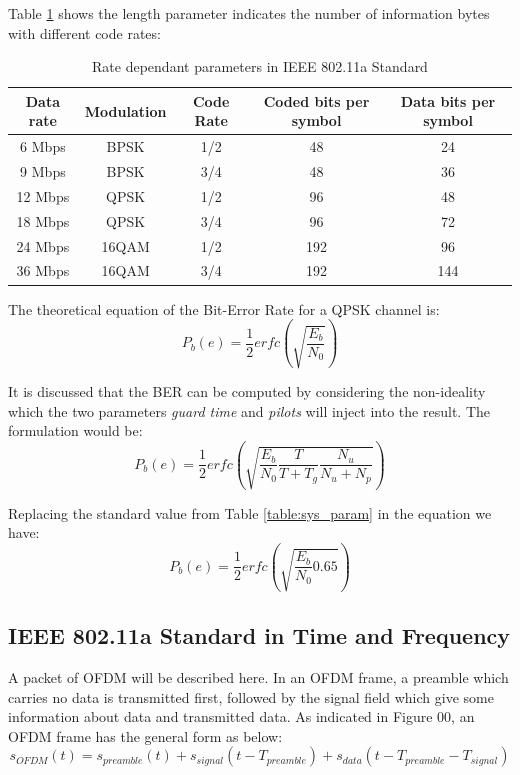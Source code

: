 Table \ref{table:code_vs_rate} shows the length parameter indicates the number of information bytes with different code rates:

\begin{table}
\centering
\vspace{0.5cm}
\begin{tabular}{c|c|c|c|c}
Data rate&Modulation&Code Rate&Coded bits per symbol&Data bits per symbol\\ \hline
6 Mbps&BPSK&1/2&48&24\\
9 Mbps&BPSK&3/4&48&36\\
12 Mbps&QPSK&1/2&96&48\\
18 Mbps&QPSK&3/4&96&72\\
24 Mbps&16QAM&1/2&192&96\\
36 Mbps&16QAM&3/4&192&144\\
\end{tabular}
\caption{Rate dependant parameters in IEEE 802.11a Standard}
\label{table:code_vs_rate}
\end{table}

The theoretical equation of the Bit-Error Rate for a QPSK channel is:\\

\begin{equation} \label{theo_ber}
P_{b}(e)= \dfrac{1}{2}erfc(\sqrt{\dfrac{E_{b}}{N_{0}}})
\end{equation}

It is discussed that the BER can be computed by considering the non-ideality which the two parameters \textit{guard time} and \textit{pilots} will inject into the result. The formulation would be:\\

\begin{equation} \label{theo_ber_guard_pilot}
P_{b}(e)= \dfrac{1}{2}erfc(\sqrt{\dfrac{E_{b}}{N_{0}}\dfrac{T}{T+T_{g}}\dfrac{N_{u}}{N_{u}+N_{p}}})
\end{equation}

Replacing the standard value from Table \ref{table:sys_param} in the equation we have:\\

\begin{equation} \label{theo_ber_ieee}
P_{b}(e)= \dfrac{1}{2}erfc(\sqrt{\dfrac{E_{b}}{N_{0}}0.65})
\end{equation}

\subsection{IEEE 802.11a Standard in Time and Frequency}
\label{section:ieee_standard}
A packet of OFDM will be described here. In an OFDM frame, a preamble which carries no data is transmitted first, followed by the signal field which give some information about data and transmitted data. As indicated in Figure 00, an OFDM frame has the general form as below:
\begin{equation} \label{sym_ofdm}
s_{OFDM}(t)= s_{preamble}(t)+ s_{signal}(t- T_{preamble})+ s_{data}(t- T_{preamble}- T_{signal})
\end{equation}

